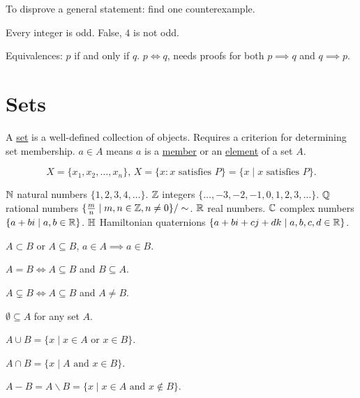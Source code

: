 \documentclass[]{article}
\begin{document}
To disprove a general statement: find one counterexample.

\begin{example}
	Every integer is odd. False, $4$ is not odd.
\end{example}

Equivalences: $p$ if and only if $q$. $p\Longleftrightarrow q$, needs proofs for both $p\implies q$ and $q\implies p$.

\section{Sets}

A \ul{set} is a well-defined collection of objects. Requires a criterion for determining set membership. $a\in A$ means $a$ is a \ul{member} or an \ul{element} of a set $A$.

$$X = \{ x_1,x_2,\dots,x_n\}, \, X = \{ x: x \text{ satisfies } P\} = \{x \mid x \text{ satisfies } P\}.$$

$\mathbb{N}$ natural numbers $\{1,2,3,4,\dots\}$.
$\mathbb{Z}$ integers $\{\dots,-3,-2,-1,0,1,2,3,\dots\}$.
$\mathbb{Q}$ rational numbers $\{\frac{m}{n} \mid m,n\in \mathbb{Z}, n\neq 0\}/\sim$.
$\mathbb{R}$ real numbers.
$\mathbb{C}$ complex numbers $\{a+bi \mid a,b\in\mathbb{R}\}$.
$\mathbb{H}$ Hamiltonian quaternions $\{a+bi+cj+dk \mid a,b,c,d\in\mathbb{R}\}$.

\begin{definition}
	[Subset] $A\subset B$ or $A\subseteq B$, $a\in A \implies a\in B$.
\end{definition}
\begin{definition}
	$A = B \Longleftrightarrow A \subseteq B$ and $B\subseteq A$.
\end{definition}

\begin{definition}
	 $A\subsetneq B \Longleftrightarrow A\subseteq B$ and $A\neq B$.
\end{definition}
\begin{definition}
	 $\emptyset \subseteq A$ for any set $A$.
\end{definition}

\begin{definition}
	[Union] $A\cup B = \{ x\mid x\in A \text{ or } x\in B\}$.
\end{definition}
\begin{definition}
	[Intersection] $A\cap B = \{x \mid A \text{ and } x\in B\}$.
\end{definition}
\begin{definition}
	[Difference] $A-B = A\backslash B = \{x \mid x\in A \text{ and } x\notin B\}$.
\end{definition}
\end{document}
